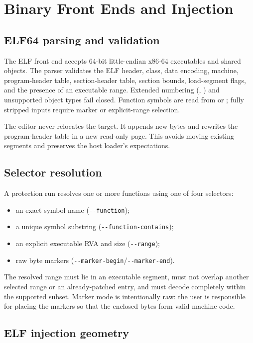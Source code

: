 \section{Binary Front Ends and Injection}
\label{sec:frontends}

\subsection{ELF64 parsing and validation}

The ELF front end accepts 64-bit little-endian x86-64 executables and shared
objects. The parser validates the ELF header, class, data encoding, machine,
program-header table, section-header table, section bounds, load-segment flags,
and the presence of an executable range. Extended numbering (,
) and unsupported object types fail closed. Function symbols
are read from  or ; fully stripped inputs require
marker or explicit-range selection.

The editor never relocates the target. It appends new bytes and rewrites the
program-header table in a new read-only page. This avoids moving existing
segments and preserves the host loader's expectations.

\subsection{Selector resolution}

A protection run resolves one or more functions using one of four selectors:

\begin{itemize}
  \item an exact symbol name (\verb|--function|);
  \item a unique symbol substring (\verb|--function-contains|);
  \item an explicit executable RVA and size (\verb|--range|);
  \item raw byte markers (\verb|--marker-begin|/\verb|--marker-end|).
\end{itemize}

The resolved range must lie in an executable segment, must not overlap another
selected range or an already-patched entry, and must decode completely within the
supported subset. Marker mode is intentionally raw: the user is responsible for
placing the markers so that the enclosed bytes form valid machine code.

\subsection{ELF injection geometry}

